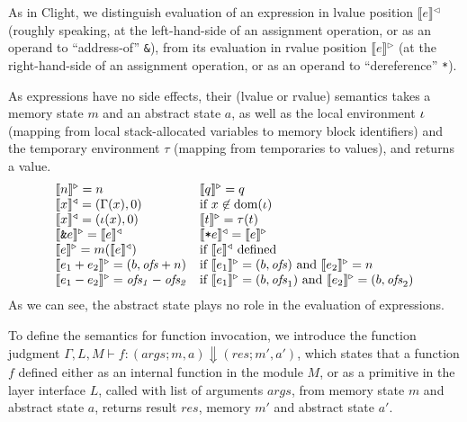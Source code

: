 As in Clight, we distinguish evaluation of an expression in lvalue
position $\llbracket{} e \rrbracket{}^\triangleleft$ (roughly
speaking, at the left-hand-side of an assignment operation, or as an
operand to ``address-of'' \texttt{\&}), from its evaluation in rvalue
position $\llbracket{} e \rrbracket{}^\triangleright$ (at the
right-hand-side of an assignment operation, or as an operand to
``dereference'' \texttt{*}).

As expressions have no side effects, their (lvalue or rvalue)
semantics takes a memory state $m$ and an abstract state $a$, as well
as the local environment $\iota$ (mapping from local stack-allocated
variables to memory block identifiers) and the temporary environment
$\tau$ (mapping from temporaries to values), and returns a value.
\[
\begin{array}{ll}
  \llbracket{} n \rrbracket{}^\triangleright  = n &
  \llbracket{} q \rrbracket{}^\triangleright  = q \\
  \llbracket{} x \rrbracket{}^\triangleleft = (\Gamma(x), 0) & \text{if} ~ x \not\in \mathrm{dom}(\iota) \\
  \llbracket{} x \rrbracket{}^\triangleleft = (\iota(x), 0)  
  &
  \llbracket{} t \rrbracket{}^\triangleright  = \tau(t) \\
  \llbracket{} \texttt{\&}e \rrbracket{}^\triangleright  = \llbracket{} e \rrbracket{}^\triangleleft &
  \llbracket{} \texttt{*}e \rrbracket{}^\triangleleft  = \llbracket{} e \rrbracket{}^\triangleright \\
  \llbracket{} e \rrbracket{}^\triangleright  = m(\llbracket{} e \rrbracket{}^\triangleleft) & \text{if} ~ \llbracket{} e \rrbracket{}^\triangleleft ~ \text{defined} \\
  \llbracket{} e_1 + e_2 \rrbracket{}^\triangleright  = (b, \mathit{ofs} + n) & \text{if} ~ \llbracket{} e_1 \rrbracket{}^\triangleright = (b, \mathit{ofs})  \text{ and} ~ \llbracket{} e_2 \rrbracket{}^\triangleright = n \\
  \llbracket{} e_1 - e_2 \rrbracket{}^\triangleright  = \mathit{ofs_1} - \mathit{ofs_2} & \text{if} ~ \llbracket{} e_1 \rrbracket{}^\triangleright = (b, \mathit{ofs}_1)  \text{ and} ~ \llbracket{} e_2 \rrbracket{}^\triangleright = (b, \mathit{ofs}_2)
\end{array}
\]
As we can see, the abstract state plays no role in the evaluation of
expressions.

To define the semantics for function invocation, 
we introduce the function judgment $\Gamma, L, M \vdash f : (\mathit{args};
m, a) \Downarrow (\mathit{res}; m', a')$, which states that a function $f$
defined either as an internal function in the module $M$, or as a
primitive in the layer interface $L$, called with list of arguments
$\mathit{args}$, from memory state $m$ and abstract state $a$, returns
result $\mathit{res}$, memory $m'$ and abstract state $a'$.

